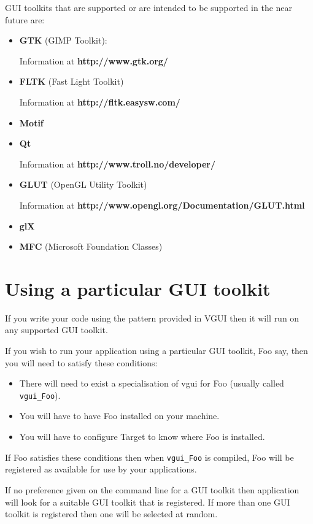 \documentclass[12pt]{report} \usepackage{epsfig}
\begin{document}
GUI toolkits that are supported or are intended to be supported in the near future are:
\begin{itemize}
\item {\bf GTK} (GIMP Toolkit):

  Information at {\bf http://www.gtk.org/}

\item {\bf FLTK}  (Fast Light Toolkit)

  Information at {\bf http://fltk.easysw.com/}

\item {\bf Motif}

\item {\bf Qt}

  Information at {\bf http://www.troll.no/developer/}

\item {\bf GLUT} (OpenGL Utility Toolkit)

  Information at {\bf http://www.opengl.org/Documentation/GLUT.html}

\item {\bf glX}

\item {\bf MFC} (Microsoft Foundation Classes)
\end{itemize}

\section{Using a particular GUI toolkit}
If you write your code using the pattern provided in VGUI then it will run on any
supported GUI toolkit.

If you wish to run your application using a particular GUI toolkit, Foo say, then
you will need to satisfy these conditions:
\begin{itemize}
\item There will need to exist a specialisation of vgui for Foo (usually called {\tt vgui\_Foo}).
\item You will have to have Foo installed on your machine.
\item You will have to configure Target to know where Foo is installed.
\end{itemize}
If Foo satisfies these conditions then when {\tt vgui\_Foo} is compiled, Foo will be registered
as available for use by your applications.

If no preference given on the command line for a GUI toolkit then application will look for
a suitable GUI toolkit that is registered.  If more than one GUI toolkit is registered then one
will be selected at random.
\end{document}
